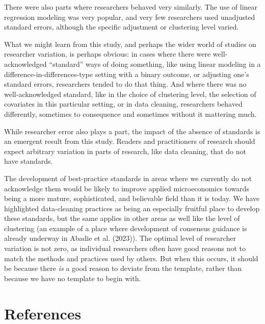 \documentclass[
  letterpaper,
  DIV=11,
  numbers=noendperiod]{scrartcl}
\begin{document}
There were also parts where researchers behaved very similarly. The use
of linear regression modeling was very popular, and very few researchers
used unadjusted standard errors, although the specific adjustment or
clustering level varied.

What we might learn from this study, and perhaps the wider world of
studies on researcher variation, is perhaps obvious: in cases where
there were well-acknowledged ``standard'' ways of doing something, like
using linear modeling in a difference-in-differences-type setting with a
binary outcome, or adjusting one's standard errors, researchers tended
to do that thing. And where there was no well-acknowledged standard,
like in the choice of clustering level, the selection of covariates in
this particular setting, or in data cleaning, researchers behaved
differently, sometimes to consequence and sometimes without it mattering
much.

While researcher error also plays a part, the impact of the absence of
standards is an emergent result from this study. Readers and
practitioners of research should expect arbitrary variation in parts of
research, like data cleaning, that do not have standards.

The development of best-practice standards in areas where we currently
do not acknowledge them would be likely to improve applied
microeconomics towards being a more mature, sophisticated, and
believable field than it is today. We have highlighted data-cleaning
practices as being an especially fruitful place to develop these
standards, but the same applies in other areas as well like the level of
clustering (an example of a place where development of consensus
guidance is already underway in Abadie et al. (2023)). The optimal level
of researcher variation is not zero, as individual researchers often
have good reasons not to match the methods and practices used by others.
But when this occurs, it should be because there \emph{is} a good reason
to deviate from the template, rather than because we have no template to
begin with.

\section*{References}\label{references}
\end{document}
